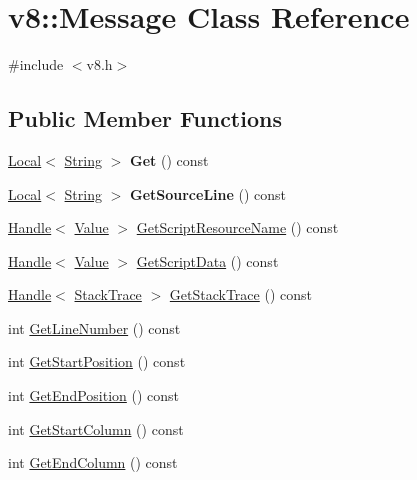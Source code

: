 \hypertarget{classv8_1_1_message}{}\section{v8\+:\+:Message Class Reference}
\label{classv8_1_1_message}


{\ttfamily \#include $<$v8.\+h$>$}

\subsection*{Public Member Functions}
\begin{DoxyCompactItemize}
\item 
\hypertarget{classv8_1_1_message_a72f26c7b684bbfbd14d5970849fdf3d2}{}\hyperlink{classv8_1_1_local}{Local}$<$ \hyperlink{classv8_1_1_string}{String} $>$ {\bfseries Get} () const \label{classv8_1_1_message_a72f26c7b684bbfbd14d5970849fdf3d2}

\item 
\hypertarget{classv8_1_1_message_a0d5cceb5128a147818c72b82950e475d}{}\hyperlink{classv8_1_1_local}{Local}$<$ \hyperlink{classv8_1_1_string}{String} $>$ {\bfseries Get\+Source\+Line} () const \label{classv8_1_1_message_a0d5cceb5128a147818c72b82950e475d}

\item 
\hyperlink{classv8_1_1_handle}{Handle}$<$ \hyperlink{classv8_1_1_value}{Value} $>$ \hyperlink{classv8_1_1_message_ac5d31afb758897cd1653c5eb3327a4d6}{Get\+Script\+Resource\+Name} () const 
\item 
\hyperlink{classv8_1_1_handle}{Handle}$<$ \hyperlink{classv8_1_1_value}{Value} $>$ \hyperlink{classv8_1_1_message_ace10c210ccbb542b1b75cadefbc4e899}{Get\+Script\+Data} () const 
\item 
\hyperlink{classv8_1_1_handle}{Handle}$<$ \hyperlink{classv8_1_1_stack_trace}{Stack\+Trace} $>$ \hyperlink{classv8_1_1_message_adeffa297a5a28955dd16c084632aa645}{Get\+Stack\+Trace} () const 
\item 
int \hyperlink{classv8_1_1_message_a67f97fd76b8f98ed65743b9615d64a79}{Get\+Line\+Number} () const 
\item 
int \hyperlink{classv8_1_1_message_a31a550a1d3d09a2d72d0742be821956f}{Get\+Start\+Position} () const 
\item 
int \hyperlink{classv8_1_1_message_a50cbec87379e628b1647466926882037}{Get\+End\+Position} () const 
\item 
int \hyperlink{classv8_1_1_message_aab8007ba81d3f195280bce0693810cc2}{Get\+Start\+Column} () const 
\item 
int \hyperlink{classv8_1_1_message_aaf82cd7f7449add5f50d4253499cad05}{Get\+End\+Column} () const 
\end{DoxyCompactItemize}
